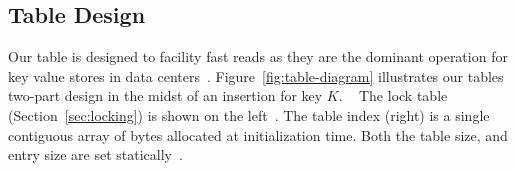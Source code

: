 


\subsection{Table Design}
\label{sec:table-design}
Our table is designed to facility fast reads as they are the
dominant operation for key value stores in data
centers~\cite{facebook-memcached}.
Figure~\ref{fig:table-diagram} illustrates our tables
two-part design in the midst of an insertion for key $K$.
~ The lock table
(Section~\ref{sec:locking}) is shown on the left~. The table index (right) is a single
contiguous array of bytes allocated at initialization time.
Both the table size, and entry size are set
statically~. 

